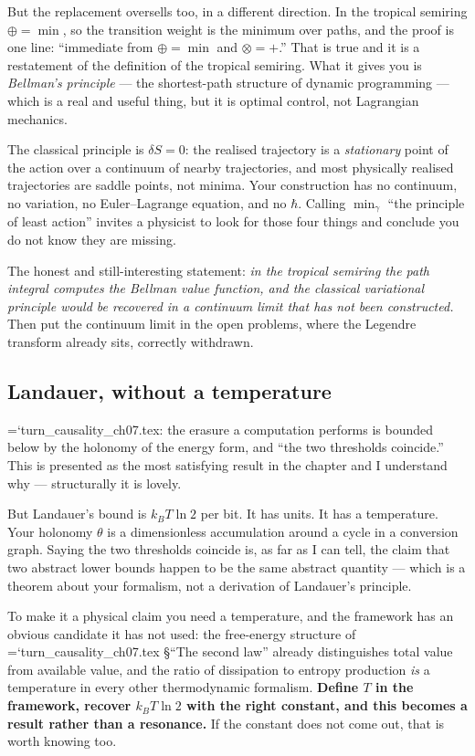 \documentclass[11pt,letterpaper]{article}
\newcommand{\loc}[1]{{\small\ttfamily\color{accent}\hyphenchar\font=`\-\relax #1}}
\newcommand{\fnd}[1]{\textbf{\color{warn}#1}}
\begin{document}
But the replacement oversells too, in a different direction. In the
tropical semiring $\oplus = \min$, so the transition weight is the
minimum over paths, and the proof is one line: ``immediate from
$\oplus = \min$ and $\otimes = +$.'' That is true and it is a
restatement of the definition of the tropical semiring. What it gives
you is \emph{Bellman's principle} --- the shortest-path structure of
dynamic programming --- which is a real and useful thing, but it is
optimal control, not Lagrangian mechanics.

The classical principle is $\delta S = 0$: the realised trajectory is a
\emph{stationary} point of the action over a continuum of nearby
trajectories, and most physically realised trajectories are saddle
points, not minima. Your construction has no continuum, no variation,
no Euler--Lagrange equation, and no $\hbar$. Calling $\min_\gamma$
``the principle of least action'' invites a physicist to look for
those four things and conclude you do not know they are missing.

The honest and still-interesting statement: \emph{in the tropical
semiring the path integral computes the Bellman value function, and
the classical variational principle would be recovered in a continuum
limit that has not been constructed.} Then put the continuum limit in
the open problems, where the Legendre transform already sits, correctly
withdrawn.

\subsection*{Landauer, without a temperature}

\loc{turn\_causality\_ch07.tex}: the erasure a computation performs is
bounded below by the holonomy of the energy form, and ``the two
thresholds coincide.'' This is presented as the most satisfying result
in the chapter and I understand why --- structurally it is lovely.

But Landauer's bound is $k_{B}T\ln 2$ per bit. It has units. It has a
temperature. Your holonomy $\theta$ is a dimensionless accumulation
around a cycle in a conversion graph. Saying the two thresholds
coincide is, as far as I can tell, the claim that two abstract lower
bounds happen to be the same abstract quantity --- which is a theorem
about your formalism, not a derivation of Landauer's principle.

To make it a physical claim you need a temperature, and the framework
has an obvious candidate it has not used: the free-energy structure of
\loc{turn\_causality\_ch07.tex} \S``The second law'' already
distinguishes total value from available value, and the ratio of
dissipation to entropy production \emph{is} a temperature in every
other thermodynamic formalism. \fnd{Define $T$ in the framework,
recover $k_{B}T\ln 2$ with the right constant, and this becomes a
result rather than a resonance.} If the constant does not come out,
that is worth knowing too.
\end{document}
